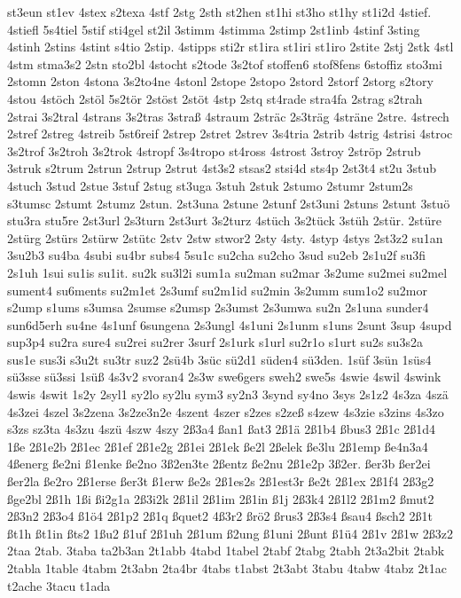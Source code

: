 {st3eun
st1ev
4stex
s2texa
4stf
2stg
2sth
st2hen
st1hi
st3ho
st1hy
st1i2d
4stief.
4stiefl
5s4tiel
5stif
sti4gel
st2il
3stimm
4stimma
2stimp
2st1inb
4stinf
3sting
4stinh
2stins
4stint
s4tio
2stip.
4stipps
sti2r
st1ira
st1iri
st1iro
2stite
2stj
2stk
4stl
4stm
stma3s2
2stn
sto2bl
4stocht
s2tode
3s2tof
stoffen6
stof8fens
6stoffiz
sto3mi
2stomn
2ston
4stona
3s2to4ne
4stonl
2stope
2stopo
2stord
2storf
2storg
s2tory
4stou
4stöch
2stöl
5s2tör
2stöst
2stöt
4stp
2stq
st4rade
stra4fa
2strag
s2trah
2strai
3s2tral
4strans
3s2tras
3straß
4straum
2sträc
2s3träg
4sträne
2stre.
4strech
2stref
2streg
4streib
5st6reif
2strep
2stret
2strev
3s4tria
2strib
4strig
4strisi
4stroc
3s2trof
3s2troh
3s2trok
4stropf
3s4tropo
st4ross
4strost
3stroy
2ströp
2strub
3struk
s2trum
2strun
2strup
2strut
4st3s2
stsas2
stsi4d
sts4p
2st3t4
st2u
3stub
4stuch
3stud
2stue
3stuf
2stug
st3uga
3stuh
2stuk
2stumo
2stumr
2stum2s
s3tumsc
2stumt
2stumz
2stun.
2st3una
2stune
2stunf
2st3uni
2stuns
2stunt
3stuö
stu3ra
stu5re
2st3url
2s3turn
2st3urt
3s2turz
4stüch
3s2tück
3stüh
2stür.
2stüre
2stürg
2stürs
2stürw
2stütc
2stv
2stw
stwor2
2sty
4sty.
4styp
4stys
2st3z2
su1an
3su2b3
su4ba
4subi
su4br
subs4
5su1c
su2cha
su2cho
3sud
su2eb
2s1u2f
su3fi
2s1uh
1sui
su1is
su1it.
su2k
su3l2i
sum1a
su2man
su2mar
3s2ume
su2mei
su2mel
sument4
su6ments
su2m1et
2s3umf
su2m1id
su2min
3s2umm
sum1o2
su2mor
s2ump
s1ums
s3umsa
2sumse
s2umsp
2s3umst
2s3umwa
su2n
2s1una
sunder4
sun6d5erh
su4ne
4s1unf
6sungena
2s3ungl
4s1uni
2s1unm
s1uns
2sunt
3sup
4supd
sup3p4
su2ra
sure4
su2rei
su2rer
3surf
2s1urk
s1url
su2r1o
s1urt
su2s
su3s2a
sus1e
sus3i
s3u2t
su3tr
suz2
2sü4b
3süc
sü2d1
süden4
sü3den.
1süf
3sün
1süs4
sü3sse
sü3ssi
1süß
4s3v2
svoran4
2s3w
swe6gers
sweh2
swe5s
4swie
4swil
4swink
4swis
4swit
1s2y
2syl1
sy2lo
sy2lu
sym3
sy2n3
3synd
sy4no
3sys
2s1z2
4s3za
4szä
4s3zei
4szel
3s2zena
3s2ze3n2e
4szent
4szer
s2zes
s2zeß
s4zew
4s3zie
s3zins
4s3zo
s3zs
sz3ta
4s3zu
4szü
4szw
4szy
2ß3a4
ßan1
ßat3
2ß1ä
2ß1b4
ßbus3
2ß1c
2ß1d4
1ße
2ß1e2b
2ß1ec
2ß1ef
2ß1e2g
2ß1ei
2ß1ek
ße2l
2ßelek
ße3lu
2ß1emp
ße4n3a4
4ßenerg
ße2ni
ß1enke
ße2no
3ß2en3te
2ßentz
ße2nu
2ß1e2p
3ß2er.
ßer3b
ßer2ei
ßer2la
ße2ro
2ß1erse
ßer3t
ß1erw
ße2s
2ß1es2s
2ß1est3r
ße2t
2ß1ex
2ß1f4
2ß3g2
ßge2bl
2ß1h
1ßi
ßi2g1a
2ß3i2k
2ß1il
2ß1im
2ß1in
ß1j
2ß3k4
2ß1l2
2ß1m2
ßmut2
2ß3n2
2ß3o4
ß1ö4
2ß1p2
2ß1q
ßquet2
4ß3r2
ßrö2
ßrus3
2ß3s4
ßsau4
ßsch2
2ß1t
ßt1h
ßt1in
ßts2
1ßu2
ß1uf
2ß1uh
2ß1um
ß2ung
ß1uni
2ßunt
ß1ü4
2ß1v
2ß1w
2ß3z2
2taa
2tab.
3taba
ta2b3an
2t1abb
4tabd
1tabel
2tabf
2tabg
2tabh
2t3a2bit
2tabk
2tabla
1table
4tabm
2t3abn
2ta4br
4tabs
t1abst
2t3abt
3tabu
4tabw
4tabz
2t1ac
t2ache
3tacu
t1ada
}
